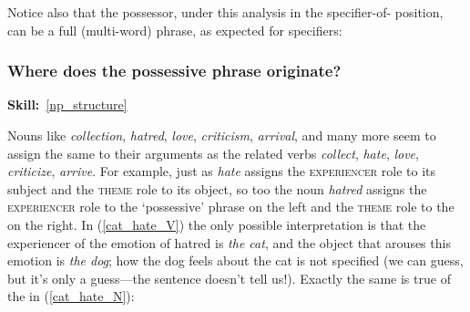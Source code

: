 \documentclass{article}
\begin{document}
Notice also that the possessor, under this analysis in the specifier-of- position, can be a full (multi-word) phrase, as expected for specifiers:
\begin{exe}
\end{exe}

        \subsubsection{Where does the possessive phrase originate?}
\hfill{}\textbf{Skill:}~\ref{np_structure}

Nouns like \emph{collection}, \emph{hatred}, \emph{love}, \emph{criticism}, \emph{arrival}, and many more seem to assign the same  to their arguments as the related verbs \emph{collect}, \emph{hate}, \emph{love}, \emph{criticize}, \emph{arrive}.
For example, just as \emph{hate} assigns the \textsc{experiencer} role to its subject and the \textsc{theme} role to its object, so too the noun \emph{hatred} assigns the \textsc{experiencer} role to the `possessive' phrase on the left and the \textsc{theme} role to the  on the right.
In (\ref{cat_hate_V}) the only possible interpretation is that the experiencer of the emotion of hatred is \emph{the cat}, and the object that arouses this emotion is \emph{the dog}; how the dog feels about the cat is not specified (we can guess, but it's only a guess---the sentence doesn't tell us!).
Exactly the same is true of the  in (\ref{cat_hate_N}):
\begin{exe}
\end{exe}
\end{document}
